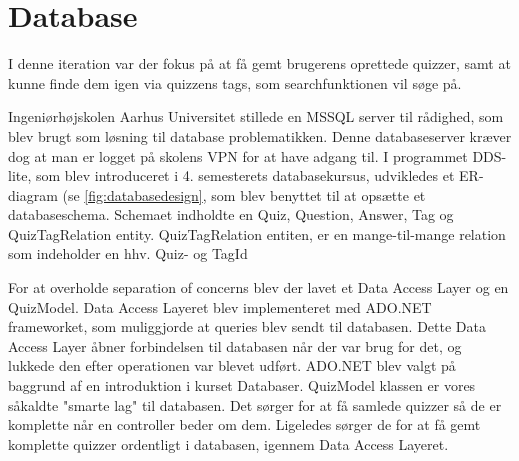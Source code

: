 \section{Database}
I denne iteration var der fokus på at få gemt brugerens oprettede quizzer, samt at kunne finde dem igen via quizzens tags, som searchfunktionen vil søge på.

Ingeniørhøjskolen Aarhus Universitet stillede en MSSQL server til rådighed, som blev brugt som løsning til database problematikken. Denne databaseserver kræver dog at man er logget på skolens VPN for at have adgang til. I programmet DDS-lite, som blev introduceret i 4. semesterets databasekursus, udvikledes et ER-diagram (se \ref{fig:databasedesign}, som blev benyttet til at opsætte et databaseschema. Schemaet indholdte en Quiz, Question, Answer, Tag og QuizTagRelation entity. QuizTagRelation entiten, er en mange-til-mange relation som indeholder en hhv. Quiz- og TagId


For at overholde separation of concerns blev der lavet et Data Access Layer og en QuizModel. Data Access Layeret blev implementeret med ADO.NET frameworket, som muliggjorde at queries blev sendt til databasen. Dette Data Access Layer åbner forbindelsen til databasen når der var brug for det, og lukkede den efter operationen var blevet udført. ADO.NET blev valgt på baggrund af en introduktion i kurset Databaser. QuizModel klassen er vores såkaldte "smarte lag" til databasen. Det sørger for at få samlede quizzer så de er komplette når en controller beder om dem. Ligeledes sørger de for at få gemt komplette quizzer ordentligt i databasen, igennem Data Access Layeret.



